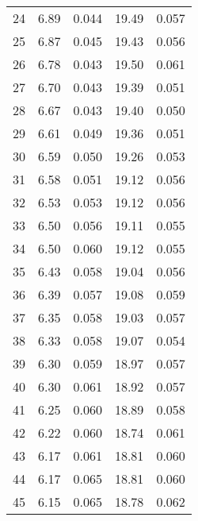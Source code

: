 \begin{table}
\begin{tabular}{c|ll|ll}
24 & 6.89 & 0.044 & 19.49 & 0.057 \\
25 & 6.87 & 0.045 & 19.43 & 0.056 \\
26 & 6.78 & 0.043 & 19.50 & 0.061 \\
27 & 6.70 & 0.043 & 19.39 & 0.051 \\
28 & 6.67 & 0.043 & 19.40 & 0.050 \\
29 & 6.61 & 0.049 & 19.36 & 0.051 \\
30 & 6.59 & 0.050 & 19.26 & 0.053 \\
31 & 6.58 & 0.051 & 19.12 & 0.056 \\
32 & 6.53 & 0.053 & 19.12 & 0.056 \\
33 & 6.50 & 0.056 & 19.11 & 0.055 \\
34 & 6.50 & 0.060 & 19.12 & 0.055 \\
35 & 6.43 & 0.058 & 19.04 & 0.056 \\
36 & 6.39 & 0.057 & 19.08 & 0.059 \\
37 & 6.35 & 0.058 & 19.03 & 0.057 \\
38 & 6.33 & 0.058 & 19.07 & 0.054 \\
39 & 6.30 & 0.059 & 18.97 & 0.057 \\
40 & 6.30 & 0.061 & 18.92 & 0.057 \\
41 & 6.25 & 0.060 & 18.89 & 0.058 \\
42 & 6.22 & 0.060 & 18.74 & 0.061 \\
43 & 6.17 & 0.061 & 18.81 & 0.060 \\
44 & 6.17 & 0.065 & 18.81 & 0.060 \\
45 & 6.15 & 0.065 & 18.78 & 0.062 \\
               \hline
        \end{tabular}
    \end{table}
    \clearpage

